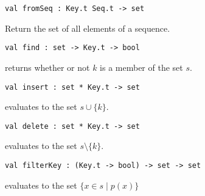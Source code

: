 \begin{cluster}
\label{grp:gr:ordset-interface:fromSeq}

\begin{gram}[fromSeq]
\label{gr:ordset-interface:fromSeq}
\begin{verbatim}
val fromSeq : Key.t Seq.t -> set
\end{verbatim}
Return the set of all elements of a sequence.

\end{gram}
\end{cluster}

\begin{cluster}
\label{grp:grm:ordset-interface::find}

\begin{gram}[find]
\label{grm:ordset-interface::find}
\begin{verbatim}
val find : set -> Key.t -> bool
\end{verbatim}
 returns whether or not $k$ is a member of the set $s$.

\end{gram}
\end{cluster}

\begin{cluster}
\label{grp:grm:ordset-interface::insert}

\begin{gram}[insert]
\label{grm:ordset-interface::insert}
\begin{verbatim}
val insert : set * Key.t -> set
\end{verbatim}
 evaluates to the set $s \cup \{k\}$.

\end{gram}
\end{cluster}

\begin{cluster}
\label{grp:grm:ordset-interface::delete}

\begin{gram}[delete]
\label{grm:ordset-interface::delete}
\begin{verbatim}
val delete : set * Key.t -> set
\end{verbatim}
 evaluates to the set $s \setminus \{k\}$.

\end{gram}
\end{cluster}

\begin{cluster}
\label{grp:grm:ordset-interface::filterkey}

\begin{gram}[filterKey]
\label{grm:ordset-interface::filterkey}
\begin{verbatim}
val filterKey : (Key.t -> bool) -> set -> set
\end{verbatim}
 evaluates to the set $\{x \in s \mathbin| p(x) \}$

\end{gram}
\end{cluster}

